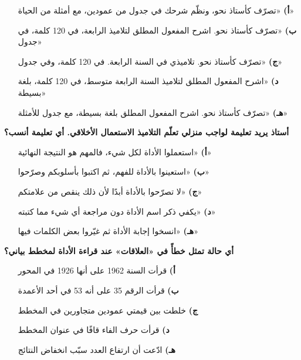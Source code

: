 \documentclass[11pt,a4paper]{article}
\begin{document}
\begin{multicols}{2}
\begin{minipage}{\linewidth}
\begin{itemize}[leftmargin=0.95cm, labelsep=4pt, itemsep=0pt, topsep=2pt, parsep=0pt]
  \item[\textbf{أ)}] «تصرّف كأستاذ نحو، ونظّم شرحك في جدول من عمودين، مع أمثلة من الحياة»
  \item[\textbf{ب)}] «تصرّف كأستاذ نحو. اشرح المفعول المطلق لتلاميذ الرابعة، في 120 كلمة، في جدول»
  \item[\textbf{ج)}] «تصرّف كأستاذ نحو. تلاميذي في السنة الرابعة. في 120 كلمة، وفي جدول»
  \item[\textbf{د)}] «اشرح المفعول المطلق لتلاميذ السنة الرابعة متوسط، في 120 كلمة، بلغة بسيطة»
  \item[\textbf{هـ)}] «تصرّف كأستاذ نحو. اشرح المفعول المطلق بلغة بسيطة، مع جدول للأمثلة»
\end{itemize}
\end{minipage}\par\vspace{7pt plus 4pt}
\noindent\begin{minipage}{\linewidth}
\hangindent=0.7cm\textbf{أستاذ يريد تعليمة لواجب منزلي تعلّم التلاميذ الاستعمال الأخلاقي. أي تعليمة أنسب؟}
\begin{itemize}[leftmargin=0.95cm, labelsep=4pt, itemsep=0pt, topsep=2pt, parsep=0pt]
  \item[\textbf{أ)}] «استعملوا الأداة لكل شيء، فالمهم هو النتيجة النهائية»
  \item[\textbf{ب)}] «استعينوا بالأداة للفهم، ثم اكتبوا بأسلوبكم وصرّحوا»
  \item[\textbf{ج)}] «لا تصرّحوا بالأداة أبدًا لأن ذلك ينقص من علامتكم»
  \item[\textbf{د)}] «يكفي ذكر اسم الأداة دون مراجعة أي شيء مما كتبته»
  \item[\textbf{هـ)}] «انسخوا إجابة الأداة ثم غيّروا بعض الكلمات فيها»
\end{itemize}
\end{minipage}\par\vspace{7pt plus 4pt}
\noindent\begin{minipage}{\linewidth}
\hangindent=0.7cm\textbf{أي حالة تمثل خطأً في «العلاقات» عند قراءة الأداة لمخطط بياني؟}
\begin{itemize}[leftmargin=0.95cm, labelsep=4pt, itemsep=0pt, topsep=2pt, parsep=0pt]
  \item[\textbf{أ)}] قرأت السنة 1962 على أنها 1926 في المحور
  \item[\textbf{ب)}] قرأت الرقم 35 على أنه 53 في أحد الأعمدة
  \item[\textbf{ج)}] خلطت بين قيمتي عمودين متجاورين في المخطط
  \item[\textbf{د)}] قرأت حرف الفاء قافًا في عنوان المخطط
  \item[\textbf{هـ)}] ادّعت أن ارتفاع العدد سبّب انخفاض النتائج
\end{itemize}
\end{minipage}\par\vspace{7pt plus 4pt}
\end{multicols}
\end{document}
